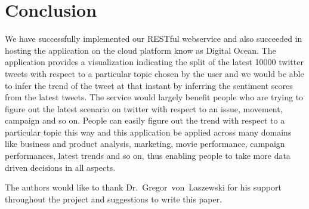 \section{Conclusion}
We have successfully implemented our RESTful webservice and also
succeeded in hosting the application on the cloud platform know as
Digital Ocean. The application provides a visualization indicating the
split of the latest 10000 twitter tweets with respect to a particular
topic chosen by the user and we would be able to infer the trend of
the tweet at that instant by inferring the sentiment scores from the
latest tweets. The service would largely benefit people who are trying
to figure out the latest scenario on twitter with respect to an issue,
movement, campaign and so on. People can easily figure out the trend
with respect to a particular topic this way and this application be
applied across many domains like business and product analysis,
marketing, movie performance, campaign performances, latest trends and
so on, thus enabling people to take more data driven decisions in all
aspects.

\begin{acks}

	The authors would like to thank Dr.~Gregor~von~Laszewski for his
	support throughout the project and suggestions to write this paper.

\end{acks}


 
